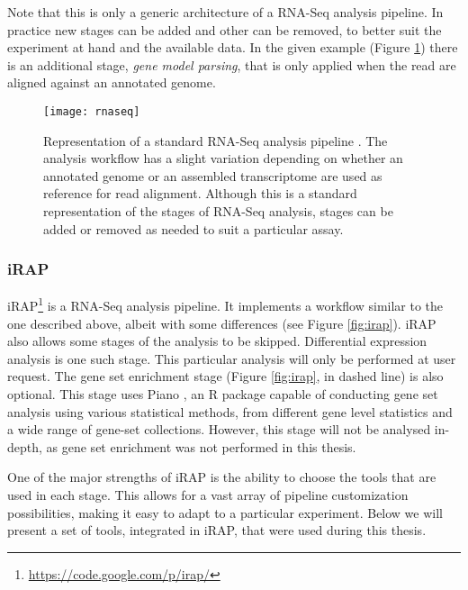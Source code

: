 Note that this is only a generic architecture of a RNA-Seq analysis pipeline. In
practice new stages can be added and other can be removed, to better suit the
experiment at hand and the available data. In the given example (Figure
\ref{fig:rnaseq}) there is an additional stage, \emph{gene model parsing}, that
is only applied when the read are aligned against an annotated genome.

\begin{figure}[!htb]
  \begin{center}
    \leavevmode
    \texttt{[image: rnaseq]}
    \caption[Representation of a standard RNA-Seq analysis pipeline]{
      Representation of a standard RNA-Seq analysis pipeline
      \cite{rnaseqpipeline}. The analysis workflow has a slight variation
      depending on whether an annotated genome or an assembled transcriptome are
      used as reference for read alignment. Although this is a standard
      representation of the stages of RNA-Seq analysis, stages can be added or
      removed as needed to suit a particular assay.
    }
    \label{fig:rnaseq}
  \end{center}
\end{figure}


\subsubsection*{iRAP}

iRAP\footnote{\url{https://code.google.com/p/irap/}} is a RNA-Seq analysis
pipeline. It implements a workflow similar to the one described above, albeit
with some differences (see Figure \ref{fig:irap}). iRAP also allows some stages
of the analysis to be skipped. Differential expression analysis is one such
stage. This particular analysis will only be performed at user request. The gene
set enrichment stage (Figure \ref{fig:irap}, in dashed line) is also optional.
This stage uses Piano \cite{varemo01042013}, an R package capable of conducting
gene set analysis using various statistical methods, from different gene level
statistics and a wide range of gene-set collections. However, this stage will
not be analysed in-depth, as gene set enrichment was not performed in this
thesis.

One of the major strengths of iRAP is the ability to choose the tools that are
used in each stage. This allows for a vast array of pipeline customization
possibilities, making it easy to adapt to a particular experiment. Below we will
present a set of tools, integrated in iRAP, that were used during this thesis.

